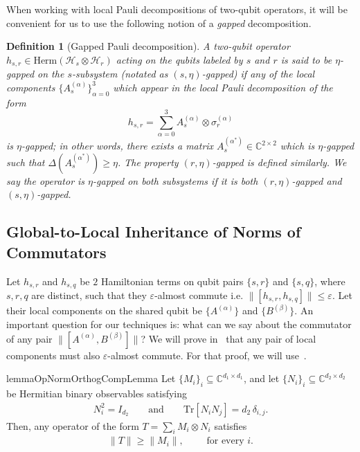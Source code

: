 \documentclass[a4paper,onecolumn,11pt]{quantumarticle}
\theoremstyle{plain}
\newtheorem{definition}[theorem]{Definition}
\newcommand{\eps}{\varepsilon}
\begin{document}
When working with local Pauli decompositions of two-qubit operators, it will be convenient for us to use the following notion of a \emph{gapped} decomposition.
\begin{definition}[Gapped Pauli decomposition]\label{def:gapped-pauli-decomp}
  A two-qubit operator $h_{s,r} \in \mathrm{Herm}(\mathcal{H}_s \otimes \mathcal{H}_r)$ acting on the qubits labeled by $s$ and $r$ is said to be $\eta$-gapped on the $s$-subsystem (notated as $(s, \eta)$-gapped) if any of the local components $\{A_s^{(\alpha)}\}_{\alpha=0}^3$ which appear in the local Pauli decomposition of the form
      \begin{equation}
        h_{s,r} = \sum\limits_{\alpha = 0}^{3} A_s^{(\alpha)} \otimes \sigma_r^{(\alpha)}
    \end{equation}
  is $\eta$-gapped; in other words, there exists a matrix $A_s^{(\alpha^*)} \in \mathbb{C}^{2 \times 2}$ which is $\eta$-gapped such that $\Delta(A_s^{(\alpha^*)}) \geq \eta$.
    The property $\left(r, \eta\right)$-gapped is defined similarly. We say the operator is $\eta$-gapped on both subsystems if it is both $\left(r, \eta\right)$-gapped and $\left(s, \eta\right)$-gapped.
\end{definition}

\subsection{Global-to-Local Inheritance of Norms of Commutators}
Let $h_{s,r}$ and $h_{s,q}$ be $2$ Hamiltonian terms on qubit pairs $\{s,r\}$ and $\{s,q\}$, where $s,r,q$ are distinct, such that they $\eps$-almost commute i.e. $\|[h_{s,r}, h_{s,q}]\| \leq \eps$. Let their local components on the shared qubit be $\{A^{(\alpha)}\}$ and $\{B^{(\beta)}\}$. An important question for our techniques is: what can we say about the commutator of any pair $\|[A^{(\alpha)}, B^{(\beta)}]\|$? We will prove in~ that any pair of local components must also $\eps$-almost commute. For that proof, we will use~.

\begin{restatable}{lemma}{OpNormOrthogCompLemma}
\label{lem:opnorm-orthog-components}
Let $\{M_i\}_i \subseteq \mathbb{C}^{d_1 \times d_1}$, and let
$\{N_i\}_i \subseteq \mathbb{C}^{d_2 \times d_2}$ be Hermitian binary
observables satisfying
\begin{align}
    N_i^2 = I_{d_2}
    \qquad \text{and} \qquad
    \mathrm{Tr}[N_i N_j] = d_2\,\delta_{i,j}.
\end{align}
Then, any operator of the form
$T = \sum_i M_i \otimes N_i$ satisfies
\begin{align}
    \|T\| \geq \|M_i\|, \qquad \text{ for every $i$.}
\end{align}
\end{restatable}
\end{document}
